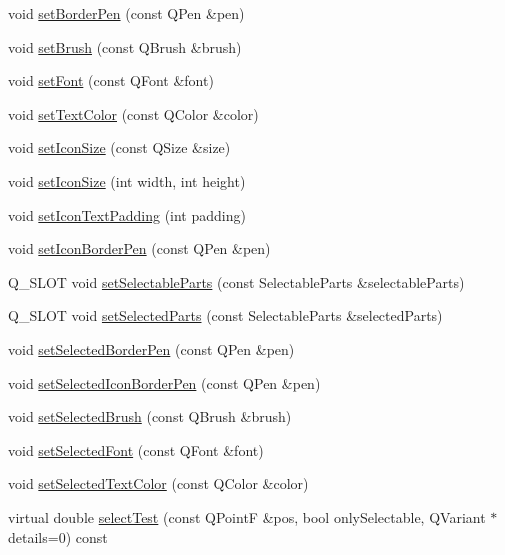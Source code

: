 \begin{DoxyCompactItemize}
\item 
void \hyperlink{classQCPLegend_a866a9e3f5267de7430a6c7f26a61db9f}{set\-Border\-Pen} (const \-Q\-Pen \&pen)
\item 
void \hyperlink{classQCPLegend_a497bbcd38baa3598c08e2b3f48103f23}{set\-Brush} (const \-Q\-Brush \&brush)
\item 
void \hyperlink{classQCPLegend_aa4cda8499e3cb0f3be415edc02984c73}{set\-Font} (const \-Q\-Font \&font)
\item 
void \hyperlink{classQCPLegend_ae1eb239ff4a4632fe1b6c3e668d845c6}{set\-Text\-Color} (const \-Q\-Color \&color)
\item 
void \hyperlink{classQCPLegend_a8b0740cce488bf7010da6beda6898984}{set\-Icon\-Size} (const \-Q\-Size \&size)
\item 
void \hyperlink{classQCPLegend_a96b1a37fd4ee6a9778e6e54fe56ab6c2}{set\-Icon\-Size} (int width, int height)
\item 
void \hyperlink{classQCPLegend_a62973bd69d5155e8ea3141366e8968f6}{set\-Icon\-Text\-Padding} (int padding)
\item 
void \hyperlink{classQCPLegend_a2f2c93d18a651f4ff294bb3f026f49b8}{set\-Icon\-Border\-Pen} (const \-Q\-Pen \&pen)
\item 
\-Q\-\_\-\-S\-L\-O\-T void \hyperlink{classQCPLegend_a9ce60aa8bbd89f62ae4fa83ac6c60110}{set\-Selectable\-Parts} (const \-Selectable\-Parts \&selectable\-Parts)
\item 
\-Q\-\_\-\-S\-L\-O\-T void \hyperlink{classQCPLegend_a2aee309bb5c2a794b1987f3fc97f8ad8}{set\-Selected\-Parts} (const \-Selectable\-Parts \&selected\-Parts)
\item 
void \hyperlink{classQCPLegend_a2c35d262953a25d96b6112653fbefc88}{set\-Selected\-Border\-Pen} (const \-Q\-Pen \&pen)
\item 
void \hyperlink{classQCPLegend_ade93aabe9bcccaf9cf46cec22c658027}{set\-Selected\-Icon\-Border\-Pen} (const \-Q\-Pen \&pen)
\item 
void \hyperlink{classQCPLegend_a875227f3219c9799464631dec5e8f1bd}{set\-Selected\-Brush} (const \-Q\-Brush \&brush)
\item 
void \hyperlink{classQCPLegend_ab580a01c3c0a239374ed66c29edf5ad2}{set\-Selected\-Font} (const \-Q\-Font \&font)
\item 
void \hyperlink{classQCPLegend_a7674dfc7a1f30e1abd1018c0ed45e0bc}{set\-Selected\-Text\-Color} (const \-Q\-Color \&color)
\item 
virtual double \hyperlink{classQCPLegend_aa3892801051bc7b985e003576df844db}{select\-Test} (const \-Q\-Point\-F \&pos, bool only\-Selectable, \-Q\-Variant $\ast$details=0) const 

\end{DoxyCompactItemize}
